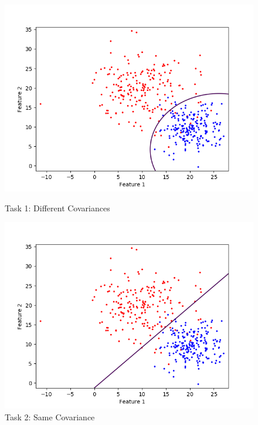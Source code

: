 \documentclass[a4paper,11pt]{article}
\begin{document}
\begin{mlsolution}

    \begin{figure}[h]
        \centering
        \begin{minipage}{0.5\textwidth}
            \centering
            \includegraphics[width=\textwidth]{Part1_Task1.png} %
            \caption*{Task 1: Different Covariances}
        \end{minipage}\hfill
        \begin{minipage}{0.5\textwidth}
            \centering
            \includegraphics[width=\textwidth]{Part1_Task2.png} %
            \caption*{Task 2: Same Covariance}
        \end{minipage}

\end{figure}
\end{mlsolution}
\end{document}
